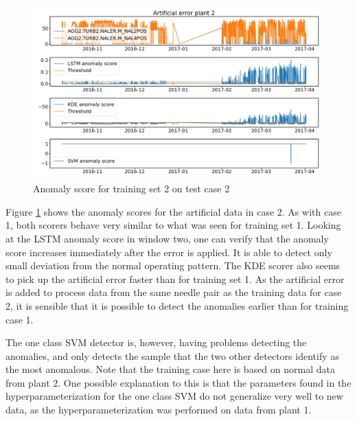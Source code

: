         \begin{figure}[h!]
            \centering
            \includegraphics[width=\textwidth]{report/figures/analysis/plant2_train_short/artificial_data_anomaly.png}
            \caption{Anomaly score for training set 2 on test case 2}
            \label{fig:plan2_short_arti_anomaly_score}
        \end{figure}
        Figure \ref{fig:plan2_short_arti_anomaly_score} shows the anomaly scores for the artificial data in case 2. As with case 1, both scorers behave very similar to what was seen for training set 1. Looking at the LSTM anomaly score in window two, one can verify that the anomaly score increases immediately after the error is applied. It is able to detect only small deviation from the normal operating pattern. The  KDE scorer also seems to pick up the artificial error faster than for training set 1. As the artificial error is added to process data from the same needle pair as the training data for case 2, it is sensible that it is possible to detect the anomalies earlier than for training case 1.   
        
        The one class SVM detector is, however, having problems detecting the anomalies, and only detects the sample that the two other detectors identify as the most anomalous. Note that the training case here is based on normal data from plant 2. One possible explanation to this is that the parameters found in the hyperparameterization for the one class SVM do not generalize very well to new data, as the hyperparameterization was performed on data from plant 1.
        
        
    
